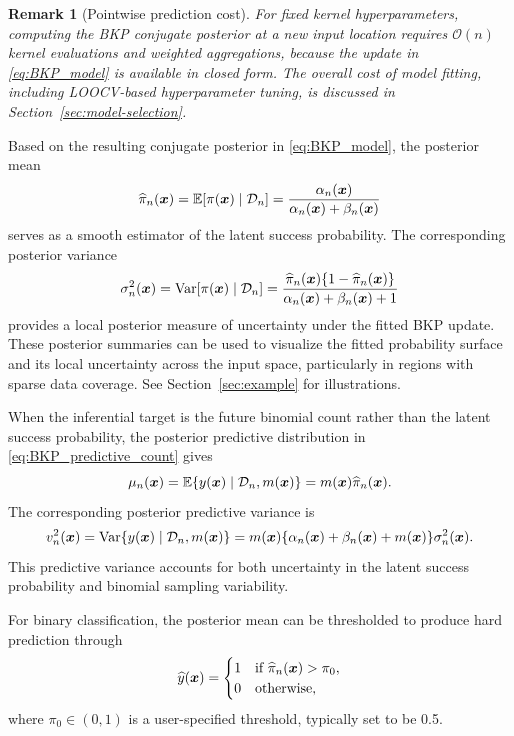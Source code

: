 \documentclass[article, shortnames]{jss}
\newtheorem{remark}{Remark}
\renewcommand{\vec}[1]{\mbox{\boldmath ${#1}$}}
\begin{document}
\begin{remark}[Pointwise prediction cost]
	For fixed kernel hyperparameters, computing the BKP conjugate posterior at a new input location requires $\mathcal{O}(n)$ kernel evaluations and weighted aggregations, because the update in \eqref{eq:BKP_model} is available in closed form. 
	The overall cost of model fitting, including LOOCV-based hyperparameter tuning, is discussed in Section~\ref{sec:model-selection}.
\end{remark}

Based on the resulting conjugate posterior in \eqref{eq:BKP_model}, the posterior mean
\begin{equation}\label{eq:BKPmean}
	\widehat{\pi}_n(\vec{x}) = \mathbb{E}[\pi(\vec{x}) \mid \mathcal{D}_n] = \frac{\alpha_n(\vec{x})}{\alpha_n(\vec{x}) + \beta_n(\vec{x})}
\end{equation}
serves as a smooth estimator of the latent success probability. The corresponding posterior variance  
\begin{equation}\label{eq:BKPvar}
	\sigma^2_n(\vec{x})=\mathrm{Var}[\pi(\vec{x}) \mid \mathcal{D}_n] = \frac{\widehat{\pi}_n(\vec{x})\{1 - \widehat{\pi}_n(\vec{x})\}}{\alpha_n(\vec{x}) + \beta_n(\vec{x}) + 1}
\end{equation}
provides a local posterior measure of uncertainty under the fitted BKP update.
These posterior summaries can be used to visualize the fitted probability surface and its local uncertainty across the input space, particularly in regions with sparse data coverage. See Section~\ref{sec:example} for illustrations.

When the inferential target is the future binomial count rather than the
latent success probability, the posterior predictive distribution in
\eqref{eq:BKP_predictive_count} gives
\[
	\mu_n(\vec{x})	 = \mathbb{E}\{y(\vec{x}) \mid \mathcal{D}_n, m(\vec{x})\} = m(\vec{x})\widehat{\pi}_n(\vec{x}).
\]
The corresponding posterior predictive variance is
\[
	v^2_n(\vec{x}) = \mathrm{Var}\{y(\vec{x}) \mid \mathcal{D}_n, m(\vec{x})\} = m(\vec{x})	\{\alpha_n(\vec{x})+\beta_n(\vec{x})+m(\vec{x})\}\sigma^2_n(\vec{x}).
\]
This predictive variance accounts for both uncertainty in the latent success
probability and binomial sampling variability.

For binary classification, the posterior mean can be thresholded to produce hard prediction through
\begin{equation}\label{eq:class_cri}
	\widehat{y}(\vec{x}) =
	\begin{cases}
		1 & \text{if } \widehat{\pi}_n(\vec{x}) > \pi_0, \\
		0 & \text{otherwise},
	\end{cases}
\end{equation}
where $\pi_0 \in (0,1)$ is a user-specified threshold, typically set to be 0.5.
\end{document}
